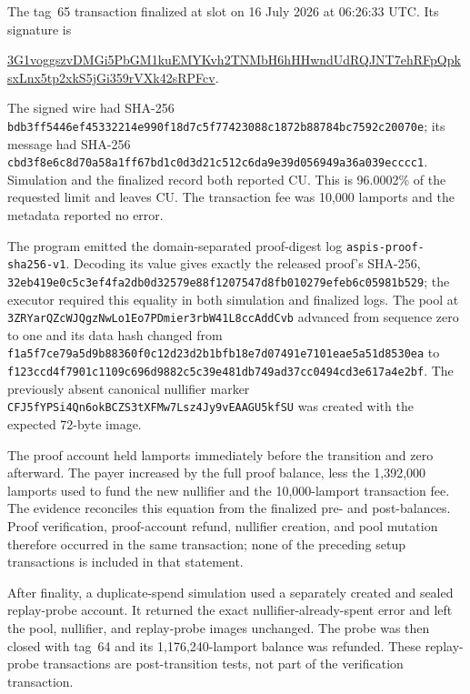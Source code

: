 The tag~65 transaction finalized at slot \ProfileMainnetSlot{} on 16 July
2026 at 06:26:33 UTC.  Its signature is
\begin{center}
  \scriptsize\ttfamily
  \href{https://explorer.solana.com/tx/3G1voggszvDMGi5PbGM1kuEMYKvh2TNMbH6hHHwndUdRQJNT7ehRFpQpksxLnx5tp2xkS5jGi359rVXk42sRPFcv?cluster=mainnet-beta}{3G1voggszvDMGi5PbGM1kuEMYKvh2TNMbH6hHHwndUdRQJNT7ehRFpQpksxLnx5tp2xkS5jGi359rVXk42sRPFcv}.
\end{center}
The signed wire had SHA-256
\nolinkurl{bdb3ff5446ef45332214e990f18d7c5f77423088c1872b88784bc7592c20070e};
its message had SHA-256
\nolinkurl{cbd3f8e6c8d70a58a1ff67bd1c0d3d21c512c6da9e39d056949a36a039ecccc1}.
Simulation and the finalized record both reported
\ProfileMainnetComputeUnits{} CU.  This is 96.0002\% of the requested limit
and leaves \ProfileMainnetComputeHeadroom{} CU.  The transaction fee was
10,000 lamports and the metadata reported no error.

The program emitted the domain-separated proof-digest log
\texttt{aspis-proof-sha256-v1}.  Decoding its value gives exactly the released
proof's SHA-256,
\nolinkurl{32eb419e0c5c3ef4fa2db0d32579e88f1207547d8fb010279efeb6c05981b529};
the executor required this equality in both simulation and finalized logs.  The pool at
\nolinkurl{3ZRYarQZcWJQgzNwLo1Eo7PDmier3rbW41L8ccAddCvb} advanced from sequence
zero to one and its data hash changed from
\nolinkurl{f1a5f7ce79a5d9b88360f0c12d23d2b1bfb18e7d07491e7101eae5a51d8530ea}
to
\nolinkurl{f123ccd4f7901c1109c696d9882c5c39e481db749ad37cc0494cd3e617a4e2bf}.
The previously absent canonical nullifier marker
\nolinkurl{CFJ5fYPSi4Qn6okBCZS3tXFMw7Lsz4Jy9vEAAGU5kfSU} was created with the
expected 72-byte image.

The proof account held \ProfileProofRentLamports{} lamports immediately before
the transition and zero afterward.  The payer increased by the full proof
balance, less the 1,392,000 lamports used to fund the new nullifier and the
10,000-lamport transaction fee.  The evidence reconciles this equation from
the finalized pre- and post-balances.  Proof verification, proof-account
refund, nullifier creation, and pool mutation therefore occurred in the same
transaction; none of the preceding setup transactions is included in that
statement.

After finality, a duplicate-spend simulation used a separately created and
sealed replay-probe account.  It returned the exact nullifier-already-spent
error and left the pool, nullifier, and replay-probe images unchanged.  The
probe was then closed with tag~64 and its 1,176,240-lamport balance was
refunded.  These replay-probe transactions are post-transition tests, not part
of the verification transaction.

